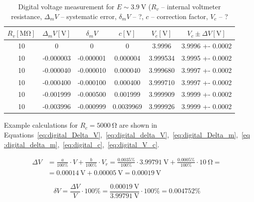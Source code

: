 \begin{table}[H]
	\centering
	\begin{tabular}{  c | c | c | c | c | c}
		 $R_v [\unit{\mega\ohm}]$ & $\Delta_m V [\unit{\volt}]$ & $\delta_m V$ & $c [\unit{\volt}]$ & $V_c [\unit{\volt}]$ & $V_c \pm \Delta V [\unit{\volt}]$\\
		\hline
		10 & 0 & 0 & 0 & 3.9996 & 3.9996 +- 0.0002\\
		\hline
		10 & -0.000003 & -0.000001 & 0.000004 & 3.999534 & 3.9995 +- 0.0002\\
		\hline
		10 & -0.000040 & -0.000010 & 0.000040 & 3.999680 & 3.9997 +- 0.0002\\
		\hline
		10 & -0.000400 & -0.000100 & 0.000400 & 3.999710 & 3.9997 +- 0.0002\\
		\hline
		10 & -0.001999 & -0.000500 & 0.001999 & 3.999909 & 3.9999 +- 0.0002\\
		\hline
		10 & -0.003996 & -0.000999& 0.0039969 & 3.999926 & 3.9999 +- 0.0002\\
	\end{tabular}
	\caption{Digital voltage measurement for $E \sim \SI{3.9}{\volt}$ ($R_v$ -- internal voltmeter resistance, $\Delta_m V$ -- systematic error, $\delta_m V$ -- ?, $c$ -- correction factor, $V_c$ -- ?}
	\label{tab:digital_voltage_2}
\end{table}

Example calculations for $R_c = \SI{5000}{\ohm}$ are shown in Equations~\ref{eq:digital_Delta_V},~\ref{eq:digital_delta_V},~\ref{eq:digital_Delta_m},~\ref{eq:digital_delta_m},~\ref{eq:digital_c},~\ref{eq:digital_V_c}.

\begin{equation}
	\begin{split}
		\Delta V &= \frac{a}{100\unit{\percent}}\cdot V + 	\frac{b}{100\unit{\percent}}\cdot V_r = \frac{0.0035\unit{\percent}}{100\unit{\percent}}\cdot\SI{3.99791}{\volt} + \frac{0.0005\unit{\percent}}{100\unit{\percent}}\cdot\SI{10}{\ohm} =\\
		&= \SI{0.00014}{\volt} + \SI{0.00005}{\volt} = \SI{0.00019}{\volt}
	\end{split}
	\label{eq:digital_Delta_V}
\end{equation}

\begin{equation}
	\delta V = \frac{\Delta V}{V}\cdot 100\unit{\percent} = \frac{\SI{0.00019}{\volt}}{\SI{3.99791}{\volt}}\cdot 100\unit{\percent} = 0.004752\unit{\percent}
	\label{eq:digital_delta_V}
\end{equation}

